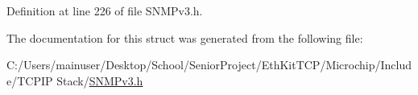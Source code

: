 Definition at line 226 of file S\+N\+M\+Pv3.\+h.



The documentation for this struct was generated from the following file\+:\begin{DoxyCompactItemize}
\item 
C\+:/\+Users/mainuser/\+Desktop/\+School/\+Senior\+Project/\+Eth\+Kit\+T\+C\+P/\+Microchip/\+Include/\+T\+C\+P\+I\+P Stack/\hyperlink{_s_n_m_pv3_8h}{S\+N\+M\+Pv3.\+h}\end{DoxyCompactItemize}

